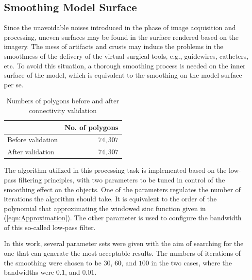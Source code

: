 \subsection{Smoothing Model Surface}

Since the unavoidable noises introduced in the phase of image acquisition and processing, uneven surfaces may be found in the surface rendered based on the imagery.
The mess of artifacts and crusts may induce the problems in the smoothness of the delivery of the virtual surgical tools, e.g., guidewires, catheters, etc.
To avoid this situation, a thorough smoothing process is needed on the inner surface of the model, which is equivalent to the smoothing on the model surface per se.
\begin{table}[t]
\renewcommand{\arraystretch}{1.3}
\caption{Numbers of polygons before and after connectivity validation}
\label{tbl:Connectivity}
\centering
\begin{tabular}
{@{}l||r@{}}
\hline
~                       & No. of polygons \\
\hline\hline
Before validation       & $74,307$  \\
After validation        & $74,307$  \\
\hline
\end{tabular}
\end{table}

The algorithm utilized in this processing task is implemented based on the low-pass filtering principles, with two parameters to be tuned in control of the smoothing effect on the objects. %
One of the parameters regulates the number of iterations the algorithm should take.
It is equivalent to the order of the polynomial that approximating the windowed sinc function given in (\ref{eqn:Approximation}).
The other parameter is used to configure the bandwidth of this so-called low-pass filter.

In this work, several parameter sets were given with the aim of searching for the one that can generate the most acceptable results.
The numbers of iterations of the smoothing were chosen to be $30$, $60$, and $100$ in the two cases, where the bandwidths were $0.1$, and $0.01$.

